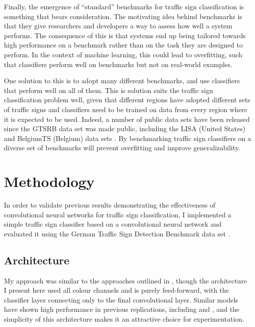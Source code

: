 \documentclass[letterpaper,twocolumn,10pt]{article}
\begin{document}
Finally, the emergence of ``standard'' benchmarks for traffic sign classification is something that bears consideration. The motivating idea behind benchmarks is that they give researchers and developers a way to assess how well a system performs. The consequence of this is that systems end up being tailored towards high performance on a benchmark rather than on the task they are designed to perform. In the context of machine learning, this could lead to overfitting, such that classifiers perform well on benchmarks but not on real-world examples.

One solution to this is to adopt many different benchmarks, and use classifiers that perform well on all of them. This is solution suits the traffic sign classification problem well, given that different regions have adopted different sets of traffic signs and classifiers need to be trained on data from every region where it is expected to be used. Indeed, a number of public data sets have been released since the GTSRB data set was made public, including the LISA (United States) and BelgiumTS (Belgium) data sets \cite{mathias_traffic_2013, mogelmose_vision-based_2012}. By benchmarking traffic sign classifiers on a diverse set of benchmarks will prevent overfitting and improve generalizability. 




\section{Methodology}

In order to validate previous results demonstrating the effectiveness of convolutional neural networks for traffic sign classification, I implemented a simple traffic sign classifier based on a convolutional neural network and evaluated it using the German Traffic Sign Detection Benchmark data set \cite{stallkamp_german_2011, stallkamp_man_2012}. 

\subsection{Architecture}

My approach was similar to the approaches outlined in \cite{sermanet_convolutional_2012, sermanet_traffic_2011}, though the architecture I present here used all colour channels and is purely feed-forward, with the classifier layer connecting only to the final convolutional layer. Similar models have shown high performance in previous replications, including \cite{keras_traffic} and \cite{tensorflow_traffic}, and the simplicity of this architecture makes it an attractive choice for experimentation.
\end{document}
